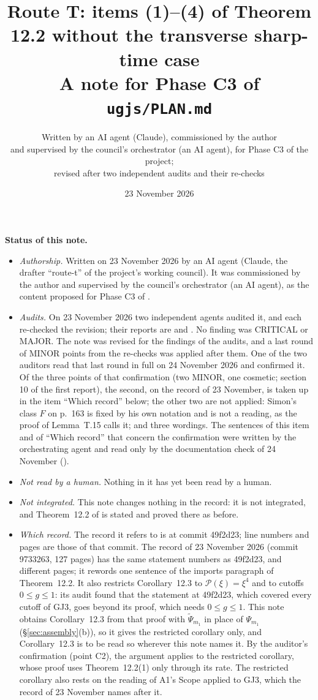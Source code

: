 \documentclass[11pt,a4paper]{article}
\title{Route T: items (1)--(4) of Theorem 12.2 without the transverse sharp-time case\\[4pt]
\large A note for Phase C3 of \texttt{ugjs/PLAN.md}}
\author{Written by an AI agent (Claude), commissioned by the author\\
\small and supervised by the council's orchestrator (an AI agent), for Phase C3 of the project;\\
\small revised after two independent audits and their re-checks}
\date{23 November 2026}
\newcommand{\Psit}{\widetilde\Psi}
\theoremstyle{plain}
\theoremstyle{definition}
\begin{document}
\maketitle

\noindent\textbf{Status of this note.}
\begin{itemize}
\item \emph{Authorship.}  Written on 23 November 2026 by an AI agent (Claude, the drafter
``route-t'' of the project's working council).  It was commissioned by the author and supervised
by the council's orchestrator (an AI agent), as the content proposed for Phase C3 of
.
\item \emph{Audits.}  On 23 November 2026 two independent agents audited it, and each re-checked
the revision; their reports are  and
.  No finding was CRITICAL or MAJOR.  The note was
revised for the findings of the audits, and a last round of MINOR points from the re-checks was
applied after them.  One of the two auditors read that last round in full on 24 November 2026 and
confirmed it.  Of the three points of that confirmation (two MINOR, one cosmetic; section 10 of
the first report), the second, on the record of 23 November, is taken up in the item ``Which
record'' below; the other two are not applied: Simon's class $F$ on p.~163 is fixed by his own
notation and is not a reading, as the proof of Lemma~T.15 calls it; and three wordings.  The
sentences of this item and of ``Which record'' that concern the confirmation were written by the
orchestrating agent and read only by the documentation check of 24 November
().
\item \emph{Not read by a human.}  Nothing in it has yet been read by a human.
\item \emph{Not integrated.}  This note changes nothing in the record: it is not integrated, and
Theorem~12.2 of  is stated and proved there as before.
\item \emph{Which record.}  The record it refers to is  at commit 49f2d23;
line numbers and pages are those of that commit.  The record of 23 November 2026 (commit
9733263, 127 pages) has the same statement numbers as 49f2d23, and different pages; it rewords one
sentence of the imports paragraph of Theorem~12.2.  It also restricts Corollary~12.3 to
$\mathscr P(\xi)=\xi^4$ and to cutoffs $0\le g\le1$: its audit found that the statement at
49f2d23, which covered every cutoff of GJ3, goes beyond its proof, which needs $0\le g\le1$.
This note obtains Corollary~12.3 from that proof with $\Psit_{m_1}$ in place of $\Psi_{m_1}$
(\S\ref{sec:assembly}(b)), so it gives the restricted corollary only, and Corollary~12.3 is to
be read so wherever this note names it.  By the auditor's confirmation (point C2), the argument
applies to the restricted corollary, whose proof uses Theorem~12.2(1) only through its rate.  The
restricted corollary also rests on the reading of A1's Scope applied to GJ3, which the record of
23 November names after it.
\end{itemize}
\end{document}
